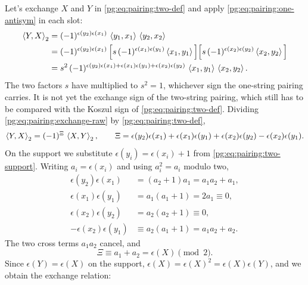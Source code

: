 Let's exchange $X$ and $Y$ in \eqref{pg:eq:pairing:two-def} and apply \eqref{pg:eq:pairing:one-antisym} in each slot:
\begin{align}
  \braket{Y, X}_2
    &
    = (-1)^{\epsilon(y_2) \epsilon(x_1)} \,
      \braket{y_1, x_1} \, \braket{y_2, x_2}
  \notag
  \\ &
    = (-1)^{\epsilon(y_2) \epsilon(x_1)} \,
      \Big[ s \, (-1)^{\epsilon(x_1) \epsilon(y_1)} \braket{x_1, y_1} \Big]
      \Big[ s \, (-1)^{\epsilon(x_2) \epsilon(y_2)} \braket{x_2, y_2} \Big]
  \notag
  \\ &
    = s^2 \, (-1)^{\epsilon(y_2) \epsilon(x_1) + \epsilon(x_1) \epsilon(y_1) + \epsilon(x_2) \epsilon(y_2)} \,
      \braket{x_1, y_1} \, \braket{x_2, y_2}.
  \label{pg:eq:pairing:exchange-raw}
\end{align}
The two factors $s$ have multiplied to $s^2 = 1$, whichever sign the one-string pairing carries.
It is not yet the exchange sign of the two-string pairing, which still has to be compared with the Koszul sign of \eqref{pg:eq:pairing:two-def}.
Dividing \eqref{pg:eq:pairing:exchange-raw} by \eqref{pg:eq:pairing:two-def},
\begin{equation}
  \braket{Y, X}_2
    = (-1)^{\Xi} \, \braket{X, Y}_2,
  \qquad
  \Xi
    = \epsilon(y_2) \epsilon(x_1)
      + \epsilon(x_1) \epsilon(y_1)
      + \epsilon(x_2) \epsilon(y_2)
      - \epsilon(x_2) \epsilon(y_1).
\end{equation}
On the support we substitute $\epsilon(y_i)=\epsilon(x_i)+1$ from \eqref{pg:eq:pairing:two-support}.
Writing $a_i=\epsilon(x_i)$ and using $a_i^2=a_i$ modulo two,
\begin{equation}
  \begin{aligned}
    \epsilon(y_2) \epsilon(x_1)
      &
      = (a_2 + 1) a_1
      = a_1 a_2 + a_1,
    \\
    \epsilon(x_1) \epsilon(y_1)
      &
      = a_1 (a_1 + 1)
      = 2 a_1
      \equiv 0,
    \\
    \epsilon(x_2) \epsilon(y_2)
      &
      = a_2 (a_2 + 1)
      \equiv 0,
    \\
    - \epsilon(x_2) \epsilon(y_1)
      &
      \equiv a_2 (a_1 + 1)
      = a_1 a_2 + a_2 .
  \end{aligned}
\end{equation}
The two cross terms $a_1a_2$ cancel, and
\begin{equation}
  \Xi
    \equiv a_1 + a_2
    = \epsilon(X)
    \pmod 2 .
\end{equation}
Since $\epsilon(Y)=\epsilon(X)$ on the support, $\epsilon(X)=\epsilon(X)^2=\epsilon(X)\epsilon(Y)$, and we obtain the exchange relation:
